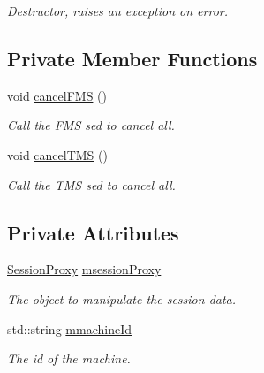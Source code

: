 \begin{DoxyCompactItemize}
\begin{DoxyCompactList}\small\item\em Destructor, raises an exception on error. \item\end{DoxyCompactList}\end{DoxyCompactItemize}
\subsection*{Private Member Functions}
\begin{DoxyCompactItemize}
\item 
\hypertarget{classProcessCtlProxy_a5826e2e3351f9adb6d0332c97e8c89f2}{
void \hyperlink{classProcessCtlProxy_a5826e2e3351f9adb6d0332c97e8c89f2}{cancelFMS} ()}
\label{classProcessCtlProxy_a5826e2e3351f9adb6d0332c97e8c89f2}

\begin{DoxyCompactList}\small\item\em Call the FMS sed to cancel all. \item\end{DoxyCompactList}\item 
\hypertarget{classProcessCtlProxy_a79cbdebd633a37d70386416e2798e7b0}{
void \hyperlink{classProcessCtlProxy_a79cbdebd633a37d70386416e2798e7b0}{cancelTMS} ()}
\label{classProcessCtlProxy_a79cbdebd633a37d70386416e2798e7b0}

\begin{DoxyCompactList}\small\item\em Call the TMS sed to cancel all. \item\end{DoxyCompactList}\end{DoxyCompactItemize}
\subsection*{Private Attributes}
\begin{DoxyCompactItemize}
\item 
\hypertarget{classProcessCtlProxy_a8a4480638a2a953c0ce6bd92aa617f8c}{
\hyperlink{classSessionProxy}{SessionProxy} \hyperlink{classProcessCtlProxy_a8a4480638a2a953c0ce6bd92aa617f8c}{msessionProxy}}
\label{classProcessCtlProxy_a8a4480638a2a953c0ce6bd92aa617f8c}

\begin{DoxyCompactList}\small\item\em The object to manipulate the session data. \item\end{DoxyCompactList}\item 
\hypertarget{classProcessCtlProxy_a61e502eebb092ace3e8c5613130e3ac0}{
std::string \hyperlink{classProcessCtlProxy_a61e502eebb092ace3e8c5613130e3ac0}{mmachineId}}
\label{classProcessCtlProxy_a61e502eebb092ace3e8c5613130e3ac0}

\begin{DoxyCompactList}\small\item\em The id of the machine. \item\end{DoxyCompactList}\end{DoxyCompactItemize}


